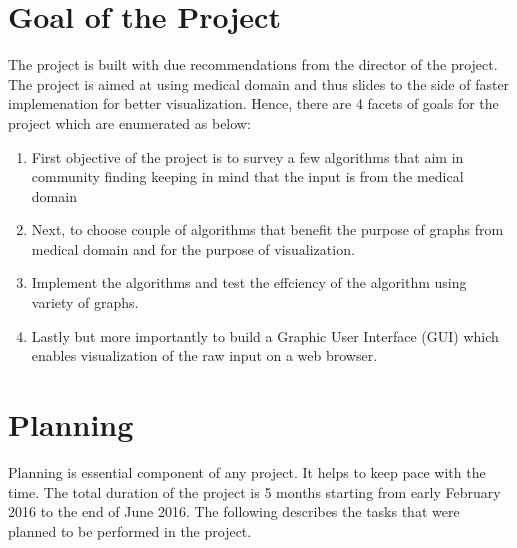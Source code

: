 \section{Goal of the Project}
The project is built with due recommendations from the director of the project. The project is aimed at using medical domain and thus slides to the side of faster implemenation for better visualization. Hence, there are 4 facets of goals for the project which are enumerated as below:
\begin{enumerate}
\item First objective of the project is to survey a few algorithms that aim in community finding keeping in mind that the input is from the medical domain 
\item Next, to choose couple of algorithms that benefit the purpose of graphs from medical domain and for the purpose of visualization.
\item Implement the algorithms and test the effciency of the algorithm using variety of graphs.
\item Lastly but more importantly to build a Graphic User Interface (GUI) which enables visualization of the raw input on a web browser.

\end{enumerate}
\section{Planning}
Planning is essential component of any project. It helps to keep pace with the time.
The total duration of the project is 5 months starting from early February 2016 to the end of June 2016. The following describes the tasks that were planned to be performed in the project.

